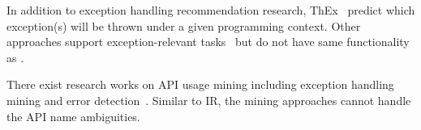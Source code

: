 In addition to exception handling recommendation research,
ThEx~\cite{throw-ase22} predict which exception(s) will be thrown
under a given programming context. Other approaches support
exception-relevant tasks~\cite{8595064,9462986,9700190} but do not
have same functionality as {\tool}.

There exist research works on API usage mining including exception
handling mining and error
detection~\cite{suresh-icse09,mithun-fase09,BW08,NNP+09,PG09,WLWXM11,NNN+12a,PJAG12,MM13,RBMR13,SBA+15,NPVN16,ANNN+16,LHXRM16,NPVN16b,TR16,MCJ17,ZGCHPG17,fse16}. Similar to IR, the
mining approaches cannot handle the API name ambiguities.



